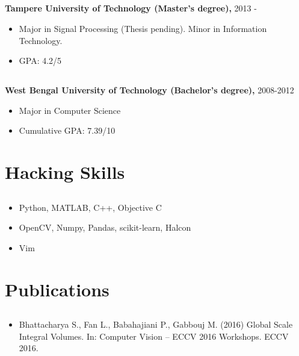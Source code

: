 \documentclass{article}
\begin{document}
\subsection{}
\textbf{Tampere University of Technology (Master's degree),} 2013 - 
\begin{itemize}[label={--}]
  \itemsep0em 
  \item Major in Signal Processing (Thesis pending). Minor in Information
    Technology.
  \item GPA: 4.2/5
\end{itemize}

\subsection{}
\textbf{West Bengal University of Technology (Bachelor's degree),} 2008-2012
\begin{itemize}[label={--}]
  \itemsep0em 
  \item Major in Computer Science
  \item Cumulative GPA: 7.39/10
\end{itemize}

\section{Hacking Skills}
\subsection{}
\begin{itemize}[label={--}]
  \itemsep0em 
  \item Python, MATLAB, C++, Objective C
  \item OpenCV, Numpy, Pandas, scikit-learn, Halcon
  \item Vim
\end{itemize}

\section{Publications}
\subsection{}
\begin{itemize}[label={--}]
  \itemsep0em 
  \item Bhattacharya S., Fan L., Babahajiani P., Gabbouj M. (2016) Global Scale
    Integral Volumes. In: Computer Vision – ECCV 2016 Workshops. ECCV 2016.
\end{itemize}
\end{document}
